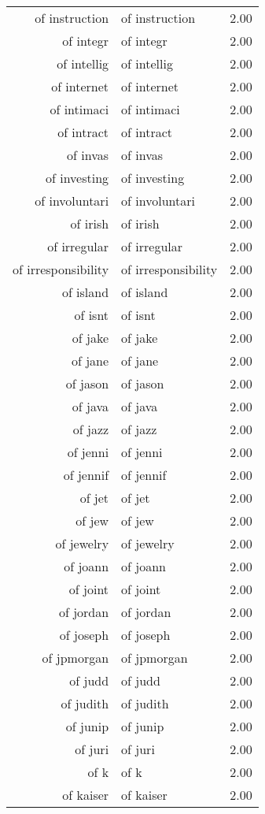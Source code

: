 \begin{table}[ht]
\begin{tabular}{rlr}
  of instruction & of instruction & 2.00 \\ 
  of integr & of integr & 2.00 \\ 
  of intellig & of intellig & 2.00 \\ 
  of internet & of internet & 2.00 \\ 
  of intimaci & of intimaci & 2.00 \\ 
  of intract & of intract & 2.00 \\ 
  of invas & of invas & 2.00 \\ 
  of investing & of investing & 2.00 \\ 
  of involuntari & of involuntari & 2.00 \\ 
  of irish & of irish & 2.00 \\ 
  of irregular & of irregular & 2.00 \\ 
  of irresponsibility & of irresponsibility & 2.00 \\ 
  of island & of island & 2.00 \\ 
  of isnt & of isnt & 2.00 \\ 
  of jake & of jake & 2.00 \\ 
  of jane & of jane & 2.00 \\ 
  of jason & of jason & 2.00 \\ 
  of java & of java & 2.00 \\ 
  of jazz & of jazz & 2.00 \\ 
  of jenni & of jenni & 2.00 \\ 
  of jennif & of jennif & 2.00 \\ 
  of jet & of jet & 2.00 \\ 
  of jew & of jew & 2.00 \\ 
  of jewelry & of jewelry & 2.00 \\ 
  of joann & of joann & 2.00 \\ 
  of joint & of joint & 2.00 \\ 
  of jordan & of jordan & 2.00 \\ 
  of joseph & of joseph & 2.00 \\ 
  of jpmorgan & of jpmorgan & 2.00 \\ 
  of judd & of judd & 2.00 \\ 
  of judith & of judith & 2.00 \\ 
  of junip & of junip & 2.00 \\ 
  of juri & of juri & 2.00 \\ 
  of k & of k & 2.00 \\ 
  of kaiser & of kaiser & 2.00 \\ 

\end{tabular}
\end{table}
